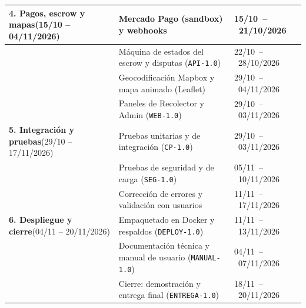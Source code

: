 \documentclass[letterpaper,11pt]{article}
\begin{document}
\begin{longtable}{|>{\raggedright\arraybackslash}p{3.1cm}|>{\raggedright\arraybackslash}p{7.1cm}|>{\raggedright\arraybackslash}p{3.7cm}|}
\hline
\textbf{4. Pagos, escrow y mapas}\newline (15/10 -- 04/11/2026) & Mercado Pago (sandbox) y webhooks & \mbox{15/10 -- 21/10/2026} \\
\cline{2-3}
 & Máquina de estados del escrow y disputas (\texttt{API-1.0}) & \mbox{22/10 -- 28/10/2026} \\
\cline{2-3}
 & Geocodificación Mapbox y mapa animado (Leaflet) & \mbox{29/10 -- 04/11/2026} \\
\cline{2-3}
 & Paneles de Recolector y Admin (\texttt{WEB-1.0}) & \mbox{29/10 -- 03/11/2026} \\
\hline
\textbf{5. Integración y pruebas}\newline (29/10 -- 17/11/2026) & Pruebas unitarias y de integración (\texttt{CP-1.0}) & \mbox{29/10 -- 03/11/2026} \\
\cline{2-3}
 & Pruebas de seguridad y de carga (\texttt{SEG-1.0}) & \mbox{05/11 -- 10/11/2026} \\
\cline{2-3}
 & Corrección de errores y validación con usuarios & \mbox{11/11 -- 17/11/2026} \\
\hline
\textbf{6. Despliegue y cierre}\newline (04/11 -- 20/11/2026) & Empaquetado en Docker y respaldos (\texttt{DEPLOY-1.0}) & \mbox{11/11 -- 13/11/2026} \\
\cline{2-3}
 & Documentación técnica y manual de usuario (\texttt{MANUAL-1.0}) & \mbox{04/11 -- 07/11/2026} \\
\cline{2-3}
 & Cierre: demostración y entrega final (\texttt{ENTREGA-1.0}) & \mbox{18/11 -- 20/11/2026} \\
\hline
\end{longtable}


\newpage


\nocite{*}
\printbibliography[heading=bibintoc, title={Referencias}]
\end{document}
